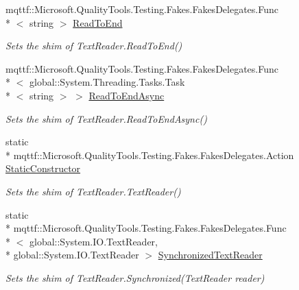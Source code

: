 \begin{DoxyCompactItemize}
mqttf\-::\-Microsoft.\-Quality\-Tools.\-Testing.\-Fakes.\-Fakes\-Delegates.\-Func\\*
$<$ string $>$ \hyperlink{class_system_1_1_i_o_1_1_fakes_1_1_shim_text_reader_a763280d7413277fa360291c8330df838}{Read\-To\-End}
\begin{DoxyCompactList}\small\item\em Sets the shim of Text\-Reader.\-Read\-To\-End()\end{DoxyCompactList}\item 
mqttf\-::\-Microsoft.\-Quality\-Tools.\-Testing.\-Fakes.\-Fakes\-Delegates.\-Func\\*
$<$ global\-::\-System.\-Threading.\-Tasks.\-Task\\*
$<$ string $>$ $>$ \hyperlink{class_system_1_1_i_o_1_1_fakes_1_1_shim_text_reader_ae7db21fabd2e4bdb5b4a2be257ccbbd1}{Read\-To\-End\-Async}
\begin{DoxyCompactList}\small\item\em Sets the shim of Text\-Reader.\-Read\-To\-End\-Async()\end{DoxyCompactList}\item 
static \\*
mqttf\-::\-Microsoft.\-Quality\-Tools.\-Testing.\-Fakes.\-Fakes\-Delegates.\-Action \hyperlink{class_system_1_1_i_o_1_1_fakes_1_1_shim_text_reader_a6ff78ff4fb602622cf664c9ce92a5a85}{Static\-Constructor}
\begin{DoxyCompactList}\small\item\em Sets the shim of Text\-Reader.\-Text\-Reader()\end{DoxyCompactList}\item 
static \\*
mqttf\-::\-Microsoft.\-Quality\-Tools.\-Testing.\-Fakes.\-Fakes\-Delegates.\-Func\\*
$<$ global\-::\-System.\-I\-O.\-Text\-Reader, \\*
global\-::\-System.\-I\-O.\-Text\-Reader $>$ \hyperlink{class_system_1_1_i_o_1_1_fakes_1_1_shim_text_reader_a92ffb0591d06aa68c27bc3457ca02cd3}{Synchronized\-Text\-Reader}
\begin{DoxyCompactList}\small\item\em Sets the shim of Text\-Reader.\-Synchronized(\-Text\-Reader reader)\end{DoxyCompactList}\item 

\end{DoxyCompactItemize}
